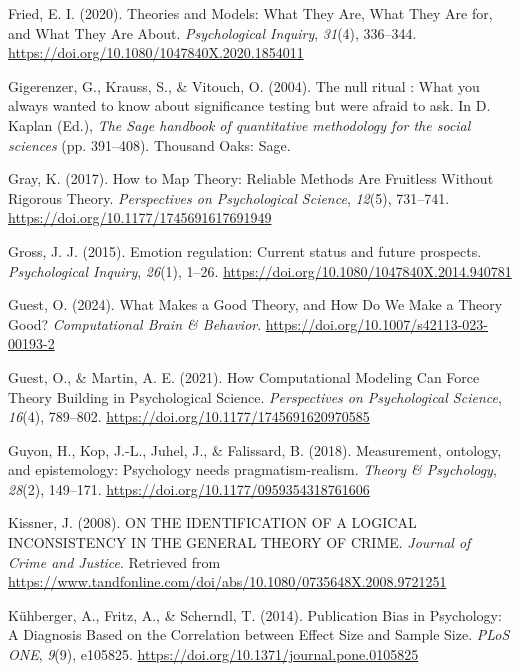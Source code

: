 \documentclass[
  man,floatsintext]{apa6}
\newlength{\cslhangindent}
\newenvironment{CSLReferences}[2] %
 {\begin{list}{}{%
  \setlength{\itemindent}{0pt}
  \setlength{\leftmargin}{0pt}
  \setlength{\parsep}{0pt}
  \ifodd #1
   \setlength{\leftmargin}{\cslhangindent}
   \setlength{\itemindent}{-1\cslhangindent}
  \fi
  \setlength{\itemsep}{#2\baselineskip}}}
 {\end{list}}
\begin{document}
\begin{CSLReferences}{1}{0}
Fried, E. I. (2020). Theories and {Models}: {What They Are}, {What They Are} for, and {What They Are About}. \emph{Psychological Inquiry}, \emph{31}(4), 336--344. \url{https://doi.org/10.1080/1047840X.2020.1854011}

Gigerenzer, G., Krauss, S., \& Vitouch, O. (2004). The null ritual : {What} you always wanted to know about significance testing but were afraid to ask. In D. Kaplan (Ed.), \emph{The {Sage} handbook of quantitative methodology for the social sciences} (pp. 391--408). Thousand Oaks: Sage.

Gray, K. (2017). How to {Map Theory}: {Reliable Methods Are Fruitless Without Rigorous Theory}. \emph{Perspectives on Psychological Science}, \emph{12}(5), 731--741. \url{https://doi.org/10.1177/1745691617691949}

Gross, J. J. (2015). Emotion regulation: {Current} status and future prospects. \emph{Psychological Inquiry}, \emph{26}(1), 1--26. \url{https://doi.org/10.1080/1047840X.2014.940781}

Guest, O. (2024). What {Makes} a {Good Theory}, and {How Do We Make} a {Theory Good}? \emph{Computational Brain \& Behavior}. \url{https://doi.org/10.1007/s42113-023-00193-2}

Guest, O., \& Martin, A. E. (2021). How {Computational Modeling Can Force Theory Building} in {Psychological Science}. \emph{Perspectives on Psychological Science}, \emph{16}(4), 789--802. \url{https://doi.org/10.1177/1745691620970585}

Guyon, H., Kop, J.-L., Juhel, J., \& Falissard, B. (2018). Measurement, ontology, and epistemology: {Psychology} needs pragmatism-realism. \emph{Theory \& Psychology}, \emph{28}(2), 149--171. \url{https://doi.org/10.1177/0959354318761606}

Kissner, J. (2008). {ON THE IDENTIFICATION OF A LOGICAL INCONSISTENCY IN THE GENERAL THEORY OF CRIME}. \emph{Journal of Crime and Justice}. Retrieved from \url{https://www.tandfonline.com/doi/abs/10.1080/0735648X.2008.9721251}

Kühberger, A., Fritz, A., \& Scherndl, T. (2014). Publication {Bias} in {Psychology}: {A Diagnosis Based} on the {Correlation} between {Effect Size} and {Sample Size}. \emph{PLoS ONE}, \emph{9}(9), e105825. \url{https://doi.org/10.1371/journal.pone.0105825}


\end{CSLReferences}
\end{document}
